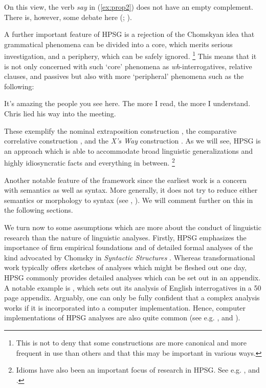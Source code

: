 \documentclass[output=paper
	        ,collection
	        ,collectionchapter
 	        ,biblatex
                ,babelshorthands
                ,newtxmath
                ,draftmode
                ,colorlinks, citecolor=brown
]{langscibook}
\begin{document}
On this view, the verb \emph{say} in (\ref{ex:prop2}) does not have an empty complement. There is, however, some debate here (\citealp{SF94a,Mueller2004e}; ).

A further important feature of HPSG is a rejection of the Chomskyan idea that grammatical phenomena can be divided into a core, which merits serious investigation, and a periphery, which can be safely ignored.%
%
\footnote{This is not to deny that some constructions are more canonical and more frequent in use than others and that this may be important in various ways.}
%
This means that it is not only concerned with such ‘core’ phenomena as \emph{wh}-interrogatives, relative clauses, and passives but also with more ‘peripheral’ phenomena such as the following:


\ea\label{ex:prop3}
	\ea\label{ex:prop3a}
	It’s amazing the people you see here.
	\ex\label{ex:prop3b}
	The more I read, the more I understand.
	\ex\label{ex:prop3c}
	Chris lied his way into the meeting.
	\z
\z

These exemplify the nominal extraposition construction \citep{MichaelisLambrecht1996}, the comparative correlative construction \citep{Abeille2006a,AB2008a-u,Borsley2011a-u}, and the \emph{X’s Way} construction \citep[7.4]{KF99a,Sag2012a}. As we will see, HPSG is an approach which is able to accommodate broad linguistic generalizations and highly idiosyncratic facts and everything in between.%
%
\footnote{Idioms have also been an important focus of research in HPSG. See e.g. \citealt{RS2009a,KM2019a}, and .}
%

Another notable feature of the framework since the earliest work is a concern with semantics as well as syntax. More generally, it does not try to reduce either semantics or morphology to syntax (see , ). We will comment further on this in the following sections.

We turn now to some assumptions which are more about the conduct of linguistic research than the nature of linguistic analyses. Firstly, HPSG emphasizes the importance of firm empirical foundations and of detailed formal analyses of the kind advocated by Chomsky in \emph{Syntactic Structures} \citep{Chomsky57a}. Whereas transformational work typically offers sketches of analyses which might be fleshed out one day, HPSG commonly provides detailed analyses which can be set out in an appendix. A notable example is \citet{GSag2000a-u}, which sets out its analysis of English interrogatives in a 50 page appendix. Arguably, one can only be fully confident that a complex analysis works if it is incorporated into a computer implementation. Hence, computer implementations of HPSG analyses are also quite common (see e.g. \citealp{Babel,MuellerCoreGram,Copestake2002a,BDFPS2010a-u,Bender2016}, and ).
\end{document}
